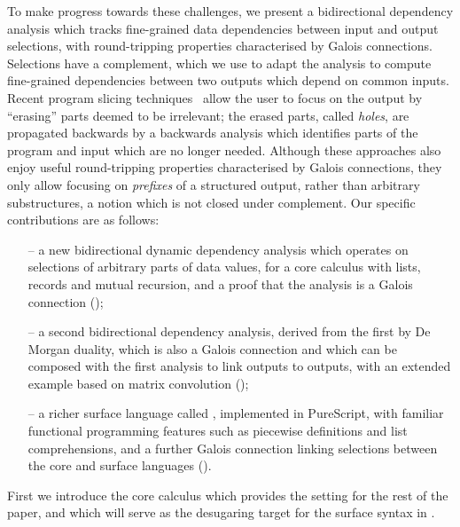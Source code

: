 To make progress towards these challenges, we present a bidirectional dependency analysis which tracks fine-grained data dependencies between input and output selections, with round-tripping properties characterised by Galois connections. Selections have a complement, which we use to adapt the analysis to compute fine-grained dependencies between two outputs which depend on common inputs. Recent program slicing techniques~\cite{perera12a,perera13a,ricciotti17} allow the user to focus on the output by ``erasing'' parts deemed to be irrelevant; the erased parts, called \emph{holes}, are propagated backwards by a backwards analysis which identifies parts of the program and input which are no longer needed. Although these approaches also enjoy useful round-tripping properties characterised by Galois connections, they only allow focusing on \emph{prefixes} of a structured output, rather than arbitrary substructures, a notion which is not closed under complement. Our specific contributions are as follows:

\begin{itemize}
   \item[--] a new bidirectional dynamic dependency analysis which operates on selections of arbitrary parts of data values, for a core calculus with lists, records and mutual recursion, and a proof that the analysis is a Galois connection ();
   \item[--] a second bidirectional dependency analysis, derived from the first by De Morgan duality, which is also a Galois connection and which can be composed with the first analysis to link outputs to outputs, with an extended example based on matrix convolution  ();
   \item[--] a richer surface language called \OurLanguage, implemented in PureScript, with familiar functional programming features such as piecewise definitions and list comprehensions, and a further Galois connection linking selections between the core and surface languages ().
\end{itemize}

\noindent First we introduce the core calculus which provides the setting for the rest of the paper, and which will serve as the desugaring target for the surface syntax in .
